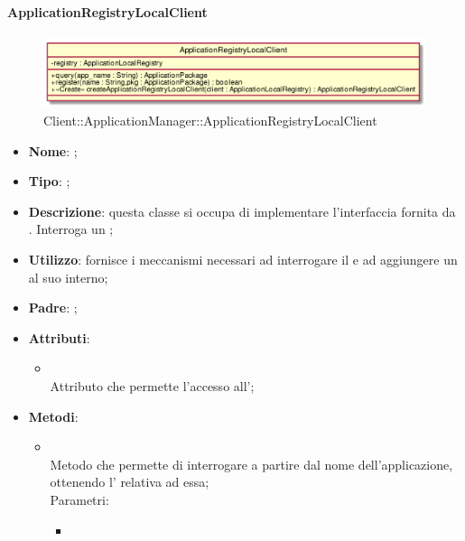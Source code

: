 \hypertarget{ApplicationRegistryLocalClient_label}{\paragraph{ApplicationRegistryLocalClient}}
\begin{figure}[h]
	\centering
	\includegraphics[width=\textwidth,height=\textheight,keepaspectratio]{images/ClassApplicationRegistryLocalClient.png}
	\caption{Client::ApplicationManager::ApplicationRegistryLocalClient}
\end{figure}
\begin{itemize}
	\item \textbf{Nome}: ;
	\item \textbf{Tipo}: ;
	\item \textbf{Descrizione}: questa classe si occupa di implementare l'interfaccia fornita da . Interroga un ;
	\item \textbf{Utilizzo}: fornisce i meccanismi necessari ad interrogare il  e ad aggiungere un  al suo interno;
	\item \textbf{Padre}: ;
	\item \textbf{Attributi}:
	\begin{itemize}
		\item[]  \\
		Attributo che permette l'accesso all';
	\end{itemize}
	\item \textbf{Metodi}:
	\begin{itemize}
		\item[]  \\
		Metodo che permette di interrogare  a partire dal nome dell'applicazione, ottenendo l' relativa ad essa;\\
		Parametri:
		\begin{itemize}
			\item {} \\

\end{itemize}
\end{itemize}
\end{itemize}
